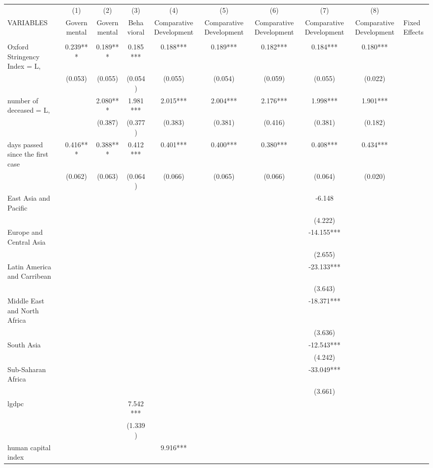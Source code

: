 \documentclass[]{article}
\begin{document}
\begin{tabular}{lcccccccc} \hline
 & (1) & (2) & (3) & (4) & (5) & (6) & (7) & (8) \\
VARIABLES & Governmental & Governmental & Behavioral & Comparative Development & Comparative Development & Comparative Development & Comparative Development & Comparative Development & Fixed Effects \\ \hline
 &  &  &  &  &  &  &  &  \\
Oxford Stringency Index = L, & 0.239*** & 0.189*** & 0.185*** & 0.188*** & 0.189*** & 0.182*** & 0.184*** & 0.180*** \\
 & (0.053) & (0.055) & (0.054) & (0.055) & (0.054) & (0.059) & (0.055) & (0.022) \\
number of deceased = L, &  & 2.080*** & 1.981*** & 2.015*** & 2.004*** & 2.176*** & 1.998*** & 1.901*** \\
 &  & (0.387) & (0.377) & (0.383) & (0.381) & (0.416) & (0.381) & (0.182) \\
days passed since the first case & 0.416*** & 0.388*** & 0.412*** & 0.401*** & 0.400*** & 0.380*** & 0.408*** & 0.434*** \\
 & (0.062) & (0.063) & (0.064) & (0.066) & (0.065) & (0.066) & (0.064) & (0.020) \\
East Asia and Pacific &  &  &  &  &  &  & -6.148 &  \\
 &  &  &  &  &  &  & (4.222) &  \\
Europe and Central Asia &  &  &  &  &  &  & -14.155*** &  \\
 &  &  &  &  &  &  & (2.655) &  \\
Latin America and Carribean &  &  &  &  &  &  & -23.133*** &  \\
 &  &  &  &  &  &  & (3.643) &  \\
Middle East and North Africa &  &  &  &  &  &  & -18.371*** &  \\
 &  &  &  &  &  &  & (3.636) &  \\
South Asia &  &  &  &  &  &  & -12.543*** &  \\
 &  &  &  &  &  &  & (4.242) &  \\
Sub-Saharan Africa &  &  &  &  &  &  & -33.049*** &  \\
 &  &  &  &  &  &  & (3.661) &  \\
lgdpc &  &  & 7.542*** &  &  &  &  &  \\
 &  &  & (1.339) &  &  &  &  &  \\
human capital index &  &  &  & 9.916*** &  &  &  &  \\

\end{tabular}
\end{document}
